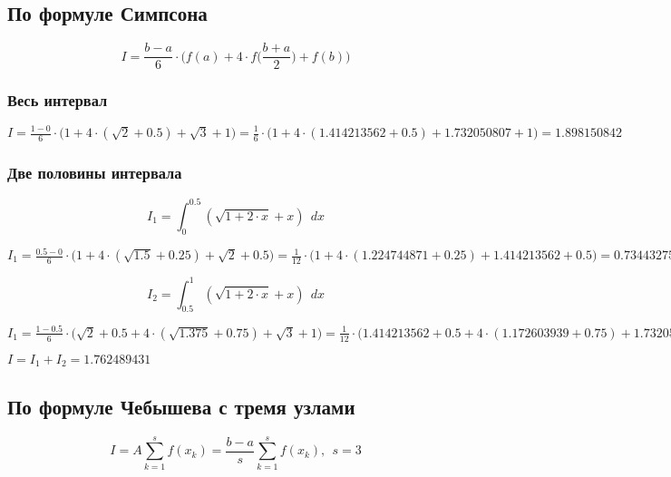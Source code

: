 \subsection{По формуле Симпсона}

\begin{displaymath}
I = \frac{b - a}{6} \cdot \Big ( f(a) + 4 \cdot f \Big (\frac{b+a}{2} \Big ) + f(b) \Big )
\end{displaymath}

\subsubsection{Весь интервал}

$I = \frac{1 - 0}{6} \cdot \Big ( 1 + 4 \cdot (\sqrt{2} + 0.5) + \sqrt{3} + 1 \Big ) = \frac{1}{6} \cdot \Big ( 1 + 4 \cdot (1.414213562 + 0.5) + 1.732050807 + 1 \Big ) = 1.898150842$

\subsubsection{Две половины интервала}

\begin{displaymath}
I_1 = \int_{0}^{0.5} (\sqrt{1 + 2 \cdot x} + x)\ \ dx
\end{displaymath}

$I_1 = \frac{0.5 - 0}{6} \cdot \Big ( 1 + 4 \cdot (\sqrt{1.5} + 0.25) + \sqrt{2} + 0.5 \Big ) = \frac{1}{12} \cdot \Big ( 1 + 4 \cdot (1.224744871 + 0.25) + 1.414213562 + 0.5 \Big ) = 0.734432754$

\begin{displaymath}
I_2 = \int_{0.5}^{1} (\sqrt{1 + 2 \cdot x} + x)\ \ dx
\end{displaymath}

$I_1 = \frac{1 - 0.5}{6} \cdot \Big ( \sqrt{2} + 0.5 +  4 \cdot (\sqrt{1.375} + 0.75) + \sqrt{3} + 1 \Big ) = \frac{1}{12} \cdot \Big ( 1.414213562 + 0.5 +  4 \cdot (1.172603939 + 0.75) + 1.732050807 + 1 \Big ) = 1.028056677$

$I = I_1 + I_2 = 1.762489431$

\subsection{По формуле Чебышева с тремя узлами}

\begin{displaymath}
I = A \sum_{k=1}^{s} f(x_k) = \frac{b - a}{s} \sum_{k=1}^{s} f(x_k),\ \ s = 3
\end{displaymath}

